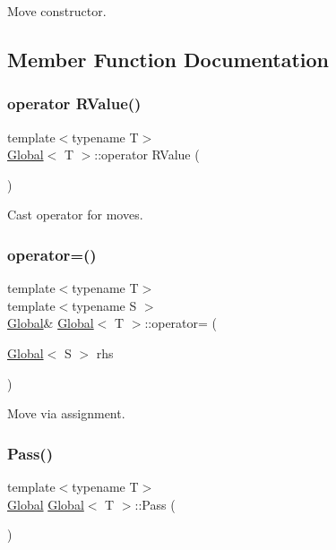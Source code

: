 Move constructor. 

\subsection{Member Function Documentation}
\mbox{\label{class_global_a76e16adc08101c6e20e4460fd202f44b}} 
\subsubsection{\texorpdfstring{operator R\+Value()}{operator RValue()}}
{\footnotesize\ttfamily template$<$typename T$>$ \\
\hyperlink{class_global}{Global}$<$ T $>$\+::operator R\+Value (\begin{DoxyParamCaption}{ }\end{DoxyParamCaption})\hspace{0.3cm}{\ttfamily [inline]}}

Cast operator for moves. \mbox{\label{class_global_a7bbb1da50ed4ba8f3e7f315c99f09335}} 
\subsubsection{\texorpdfstring{operator=()}{operator=()}}
{\footnotesize\ttfamily template$<$typename T$>$ \\
template$<$typename S $>$ \\
\hyperlink{class_global}{Global}\& \hyperlink{class_global}{Global}$<$ T $>$\+::operator= (\begin{DoxyParamCaption}\item[{\hyperlink{class_global}{Global}$<$ S $>$}]{rhs }\end{DoxyParamCaption})\hspace{0.3cm}{\ttfamily [inline]}}

Move via assignment. \mbox{\label{class_global_a60ed905942749405e9d916d3de627f72}} 
\subsubsection{\texorpdfstring{Pass()}{Pass()}}
{\footnotesize\ttfamily template$<$typename T$>$ \\
\hyperlink{class_global}{Global} \hyperlink{class_global}{Global}$<$ T $>$\+::Pass (\begin{DoxyParamCaption}{ }\end{DoxyParamCaption})\hspace{0.3cm}{\ttfamily [inline]}}

